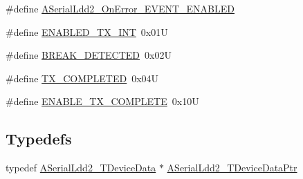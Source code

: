 \begin{DoxyCompactItemize}
\item 
\#define \hyperlink{group___a_serial_ldd2__module_gadba446a2ac10bec7ef67f2dae167bc86}{A\+Serial\+Ldd2\+\_\+\+On\+Error\+\_\+\+E\+V\+E\+N\+T\+\_\+\+E\+N\+A\+B\+L\+ED}
\item 
\#define \hyperlink{group___a_serial_ldd2__module_gab05896dbf11eed7f4078978e7287669d}{E\+N\+A\+B\+L\+E\+D\+\_\+\+T\+X\+\_\+\+I\+NT}~0x01U
\item 
\#define \hyperlink{group___a_serial_ldd2__module_ga617e6f524bf659f58012c8f0248004e5}{B\+R\+E\+A\+K\+\_\+\+D\+E\+T\+E\+C\+T\+ED}~0x02U
\item 
\#define \hyperlink{group___a_serial_ldd2__module_ga1f79d891cf81d9f65cccd3a0ab84b1ee}{T\+X\+\_\+\+C\+O\+M\+P\+L\+E\+T\+ED}~0x04U
\item 
\#define \hyperlink{group___a_serial_ldd2__module_gac0fc7ebba74ca47c17389980225ddf48}{E\+N\+A\+B\+L\+E\+\_\+\+T\+X\+\_\+\+C\+O\+M\+P\+L\+E\+TE}~0x10U
\end{DoxyCompactItemize}
\subsection*{Typedefs}
\begin{DoxyCompactItemize}
\item 
typedef \hyperlink{struct_a_serial_ldd2___t_device_data}{A\+Serial\+Ldd2\+\_\+\+T\+Device\+Data} $\ast$ \hyperlink{group___a_serial_ldd2__module_ga2484df348f7d69cde065232de2522016}{A\+Serial\+Ldd2\+\_\+\+T\+Device\+Data\+Ptr}
\end{DoxyCompactItemize}
